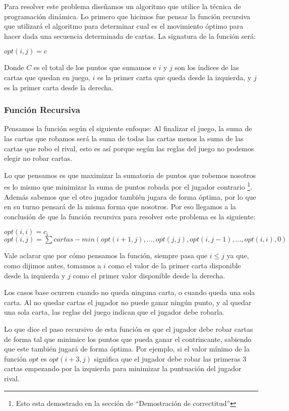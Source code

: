 Para resolver este problema diseñamos un algoritmo que utilice la técnica de programación dinámica. Lo primero que hicimos fue pensar la función recursiva que utilizará el algoritmo para determinar cual es el movimiento óptimo para hacer dada una secuencia determinada de cartas. La signatura de la función será:

$opt(i,j) = c$

Donde $C$ es el total de los puntos que sumamos e $i$ y $j$ son los índices de las cartas que quedan en juego, $i$ es la primer carta que queda desde la izquierda, y $j$ es la primer carta desde la derecha.

\subsubsection{Función Recursiva}

Pensamos la función según el siguiente enfoque: Al finalizar el juego, la suma de las cartas que robamos será la suma de todas las cartas menos la suma de las cartas que robo el rival, esto es así porque según las reglas del juego no podemos elegir no robar cartas.

Lo que pensamos es que maximizar la sumatoria de puntos que robemos nosotros es lo mismo que minimizar la suma de puntos robada por el jugador contrario \footnote{Esto esta demostrado en la sección de ``Demostración de correctitud''}. Además sabemos que el otro jugador también jugara de forma óptima, por lo que en su turno pensará de la misma forma que nosotros. Por eso llegamos a la conclusión de que la función recursiva para resolver este problema es la siguiente:

$opt(i,i) = c_i$ \\
$opt(i,j) = \sum cartas - min(opt(i+1, j), ..., opt(j,j), opt(i, j-1), ... ,opt(i,i), 0)$

Vale aclarar que por cómo pensamos la función, siempre pasa que $i \leq j$ ya que, como dijimos antes, tomamos a $i$ como el valor de la primer carta disponible desde la izquierda y $j$ como el primer valor disponible desde la derecha.

Los casos base ocurren cuando no queda ninguna carta, o cuando queda una sola carta. Al no quedar cartas el jugador no puede ganar ningún punto, y al quedar una sola carta, las reglas del juego indican que el jugador debe robarla.

Lo que dice el paso recursivo de esta función es que el jugador debe robar cartas de forma tal que minimice los puntos que pueda ganar el contrincante, sabiendo que este también jugará de forma óptima. Por ejemplo, si el valor mínimo de la función $opt$ es $opt(i+3,j)$ significa que el jugador debe robar las primeras 3 cartas empezando por la izquierda para minimizar la puntuación del jugador rival.

